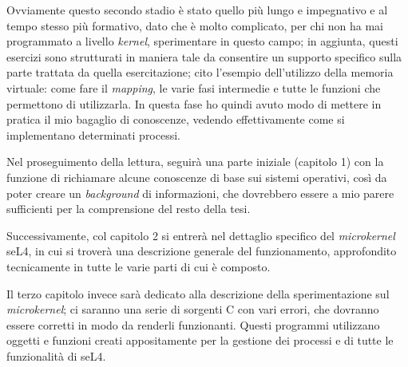 Ovviamente questo secondo stadio è stato quello più lungo e impegnativo e al tempo stesso più formativo, dato che è molto complicato, per chi non ha mai programmato a livello \textit{kernel}, sperimentare in questo campo; in aggiunta, questi esercizi sono strutturati in maniera tale da consentire un supporto specifico sulla parte trattata da quella esercitazione; cito l'esempio dell'utilizzo della memoria virtuale: come fare il \textit{mapping}, le varie fasi intermedie e tutte le funzioni che permettono di utilizzarla. In questa fase ho quindi avuto modo di mettere in pratica il mio bagaglio di conoscenze, vedendo effettivamente come si implementano determinati processi.

Nel proseguimento della lettura, seguirà una parte iniziale (capitolo 1) con la funzione di richiamare alcune conoscenze di base sui sistemi operativi, così da poter creare un \textit{background} di informazioni, che dovrebbero essere a mio parere sufficienti per la comprensione del resto della tesi.

Successivamente, col capitolo 2 si entrerà nel dettaglio specifico del \textit{microkernel} seL4, in cui si troverà una descrizione generale del funzionamento, approfondito tecnicamente in tutte le varie parti di cui è composto.

Il terzo capitolo invece sarà dedicato alla descrizione della sperimentazione sul \textit{microkernel}; ci saranno una serie di sorgenti C con vari errori, che dovranno essere corretti in modo da renderli funzionanti. Questi programmi utilizzano oggetti e funzioni creati appositamente per la gestione dei processi e di tutte le funzionalità di seL4.
